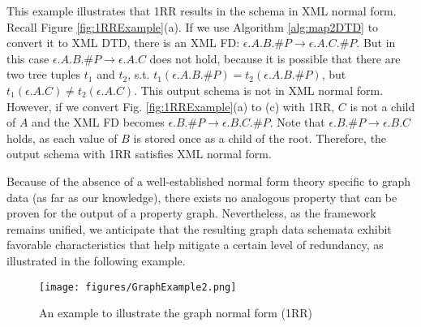 

\begin{example} This example illustrates that 1RR results in the schema in XML normal form. Recall Figure \ref{fig:1RRExample}(a).  If we use Algorithm \ref{alg:map2DTD} to convert it to XML DTD, there is an XML FD: $\epsilon.A.B.\#P \to \epsilon.A.C.\#P$. But in this case $\epsilon.A.B.\#P \to \epsilon.A.C$ does not hold, because it is possible that there are two tree tuples $t_1$ and $t_2$, s.t. $t_1(\epsilon.A.B.\#P) = t_2(\epsilon.A.B.\#P)$, but $t_1(\epsilon.A.C) \neq t_2(\epsilon.A.C)$. This output schema is not in XML normal form. However, if we convert Fig.  \ref{fig:1RRExample}(a) to (c) with 1RR, $C$ is not a child of $A$ and the XML FD becomes  $\epsilon.B.\#P \to \epsilon.B.C.\#P$. Note that $\epsilon.B.\#P \to \epsilon.B.C$ holds, as each value of $B$ is stored once as a child of the root. Therefore, the output schema with 1RR satisfies XML normal form. 
\end{example}


Because of the absence of a well-established normal form theory specific to graph data (as far as our knowledge), there exists no analogous property that can be proven for the output of a property graph. Nevertheless, as the framework remains unified, we anticipate that the resulting graph data schemata exhibit favorable characteristics that help mitigate a certain level of redundancy, as illustrated in the following example.

\begin{figure}
\centering
\texttt{[image: figures/GraphExample2.png]}
\caption{An example to illustrate the graph normal form (1RR)} \label{fig:GraphExample}
\end{figure}

